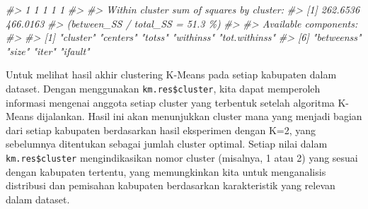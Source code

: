 \documentclass[
  oneside]{book}
\newenvironment{Shaded}{\begin{snugshade}}{\end{snugshade}}
\newcommand{\CommentTok}[1]{\textcolor[rgb]{0.56,0.35,0.01}{\textit{#1}}}
\begin{document}
\begin{Shaded}
\begin{Highlighting}[]
\CommentTok{\#\textgreater{}               1               1               1               1               1 }
\CommentTok{\#\textgreater{} }
\CommentTok{\#\textgreater{} Within cluster sum of squares by cluster:}
\CommentTok{\#\textgreater{} [1] 262.6536 466.0163}
\CommentTok{\#\textgreater{}  (between\_SS / total\_SS =  51.3 \%)}
\CommentTok{\#\textgreater{} }
\CommentTok{\#\textgreater{} Available components:}
\CommentTok{\#\textgreater{} }
\CommentTok{\#\textgreater{} [1] "cluster"      "centers"      "totss"        "withinss"     "tot.withinss"}
\CommentTok{\#\textgreater{} [6] "betweenss"    "size"         "iter"         "ifault"}
\end{Highlighting}
\end{Shaded}

Untuk melihat hasil akhir clustering K-Means pada setiap kabupaten dalam dataset. Dengan menggunakan \texttt{km.res\$cluster}, kita dapat memperoleh informasi mengenai anggota setiap cluster yang terbentuk setelah algoritma K-Means dijalankan. Hasil ini akan menunjukkan cluster mana yang menjadi bagian dari setiap kabupaten berdasarkan hasil eksperimen dengan K=2, yang sebelumnya ditentukan sebagai jumlah cluster optimal. Setiap nilai dalam \texttt{km.res\$cluster} mengindikasikan nomor cluster (misalnya, 1 atau 2) yang sesuai dengan kabupaten tertentu, yang memungkinkan kita untuk menganalisis distribusi dan pemisahan kabupaten berdasarkan karakteristik yang relevan dalam dataset.
\end{document}
